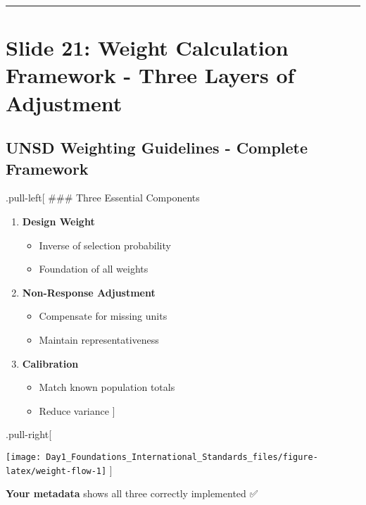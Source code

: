 \documentclass[
]{article}
\providecommand{\tightlist}{%
  \setlength{\itemsep}{0pt}\setlength{\parskip}{0pt}}
\begin{document}
\begin{center}\rule{0.5\linewidth}{0.5pt}\end{center}

\section{Slide 21: Weight Calculation Framework - Three Layers of
Adjustment}\label{slide-21-weight-calculation-framework---three-layers-of-adjustment}

\subsection{UNSD Weighting Guidelines - Complete
Framework}\label{unsd-weighting-guidelines---complete-framework}

.pull-left{[} \#\#\# Three Essential Components

\begin{enumerate}
\def\labelenumi{\arabic{enumi}.}
\tightlist
\item
  \textbf{Design Weight}

  \begin{itemize}
  \tightlist
  \item
    Inverse of selection probability
  \item
    Foundation of all weights
  \end{itemize}
\item
  \textbf{Non-Response Adjustment}

  \begin{itemize}
  \tightlist
  \item
    Compensate for missing units
  \item
    Maintain representativeness
  \end{itemize}
\item
  \textbf{Calibration}

  \begin{itemize}
  \tightlist
  \item
    Match known population totals
  \item
    Reduce variance {]}
  \end{itemize}
\end{enumerate}

.pull-right{[}

\texttt{[image: Day1\_Foundations\_International\_Standards\_files/figure-latex/weight-flow-1]}
{]}

\textbf{Your metadata} shows all three correctly implemented ✅
\end{document}
